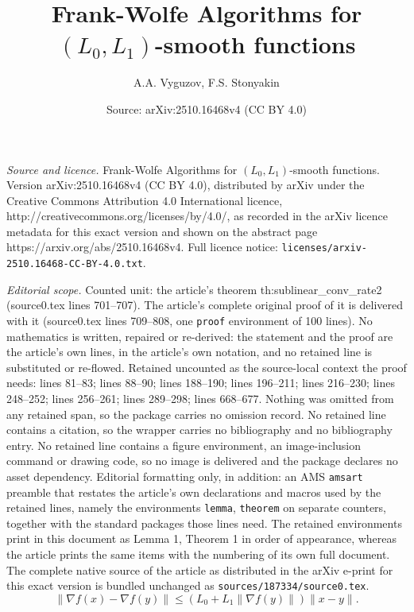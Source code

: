 \documentclass[10pt,a4paper]{amsart}
\title{Frank-Wolfe Algorithms for $(L_0, L_1)$-smooth functions}
\author{A.A. Vyguzov, F.S. Stonyakin}
\date{Source: arXiv:2510.16468v4 (CC BY 4.0)}
\begin{document}
\maketitle

\noindent\emph{Source and licence.} Frank-Wolfe Algorithms for $(L_0, L_1)$-smooth functions. Version arXiv:2510.16468v4 (CC BY 4.0), distributed by arXiv under the Creative Commons Attribution 4.0 International licence, http://creativecommons.org/licenses/by/4.0/, as recorded in the arXiv licence metadata for this exact version and shown on the abstract page https://arxiv.org/abs/2510.16468v4. Full licence notice: \texttt{licenses/arxiv-2510.16468-CC-BY-4.0.txt}.\par\smallskip

\noindent\textit{Editorial scope.} Counted unit: the article's theorem th:sublinear\_conv\_rate2 (source0.tex lines 701--707). The article's complete original proof of it is delivered with it (source0.tex lines 709--808, one \texttt{proof} environment of 100 lines). No mathematics is written, repaired or re-derived: the statement and the proof are the article's own lines, in the article's own notation, and no retained line is substituted or re-flowed.  Retained uncounted as the source-local context the proof needs: lines 81--83; lines 88--90; lines 188--190; lines 196--211; lines 216--230; lines 248--252; lines 256--261; lines 289--298; lines 668--677.  Nothing was omitted from any retained span, so the package carries no omission record.  No retained line contains a citation, so the wrapper carries no bibliography and no bibliography entry.  No retained line contains a figure environment, an image-inclusion command or drawing code, so no image is delivered and the package declares no asset dependency.  Editorial formatting only, in addition: an AMS \texttt{amsart} preamble that restates the article's own declarations and macros used by the retained lines, namely the environments \texttt{lemma}, \texttt{theorem} on separate counters, together with the standard packages those lines need.  The retained environments print in this document as Lemma 1, Theorem 1 in order of appearance, whereas the article prints the same items with the numbering of its own full document.  The complete native source of the article as distributed in the arXiv e-print for this exact version is bundled unchanged as \texttt{sources/187334/source0.tex}.
	\begin{equation}\label{def:l0_l1}
		\|\nabla f(x) - \nabla f(y)\| \le (L_0 + L_1 \|\nabla f(y)\|)\|x - y\|.
	\end{equation}
\end{document}
